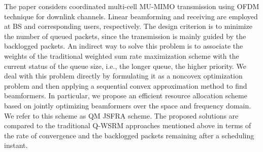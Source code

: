The paper considers coordinated multi-cell \ac{MU-MIMO} transmission using \ac{OFDM} technique for downlink channels. Linear beamforming and receiving are employed at BS and corresponding users, respectively. The design criterion is to minimize the number of queued packets, since the transmission is mainly guided by the backlogged packets. An indirect way to solve this problem is to associate the weights of the traditional weighted sum rate maximization scheme with the current  status of the queue size, i.e., the longer queue, the higher priority. We deal with this problem directly by formulating it as a noncovex optimization problem and then applying a sequential convex approximation method to find beamformers.  In particular, we propose an efficient resource allocation scheme based on jointly optimizing beamformers over the space and frequency domain. We refer to this scheme as \ac{QM} \ac{JSFRA} scheme. The proposed solutions are compared to the traditional \ac{Q-WSRM} approaches mentioned above in terms of the rate of convergence and the backlogged packets remaining after a scheduling instant.

